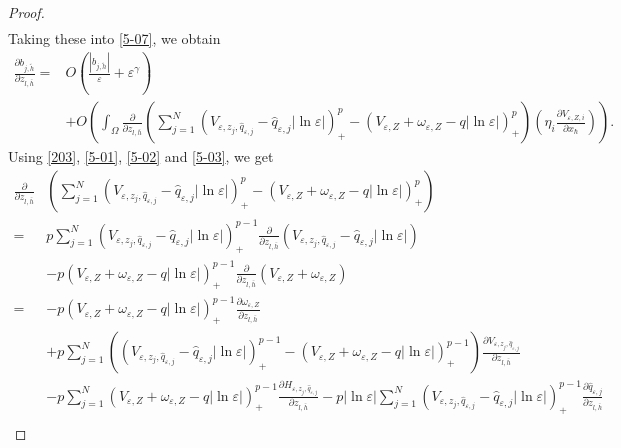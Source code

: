 \documentclass[12pt,reqno]{amsart}
\numberwithin{equation}{section}
\theoremstyle{definition}
\theoremstyle{remark}
\begin{document}
\begin{proof}
\begin{equation*}
\begin{split}
\end{split}
\end{equation*}
Taking these into \eqref{5-07}, we obtain
\begin{equation}\label{5-08}
\begin{split}
 \frac{\partial b_{j,\tilde{h}}}{\partial z_{l,\bar{h}}}=&O\left (\frac{ |b_{j,\tilde{h}}|}{\varepsilon}+\varepsilon^{\gamma}\right )\\
 &+O\left(  \int_\Omega\frac{\partial }{\partial z_{l,\bar{h}}}\left( \sum_{j=1}^N\left (V_{\varepsilon, z_j, \hat{q}_{\varepsilon,j}}-\hat{q}_{\varepsilon,j}|\ln\varepsilon|\right )^{p}_+-\left (V_{\varepsilon,Z}+\omega_{\varepsilon,Z}-q|\ln\varepsilon|\right )^{p}_+\right) \left( \eta_i\frac{\partial V_{\varepsilon, Z,i}}{\partial x_\hbar}\right) \right) .
\end{split}
\end{equation}
Using \eqref{203}, \eqref{5-01}, \eqref{5-02} and \eqref{5-03}, we get
\begin{equation*}\label{5-09}
\begin{split}
\frac{\partial }{\partial z_{l,\bar{h}}}&\left( \sum_{j=1}^N\left (V_{\varepsilon, z_j, \hat{q}_{\varepsilon,j}}-\hat{q}_{\varepsilon,j}|\ln\varepsilon|\right )^{p}_+-\left (V_{\varepsilon,Z}+\omega_{\varepsilon,Z}-q|\ln\varepsilon|\right )^{p}_+\right)\\
=& p\sum_{j=1}^N\left (V_{\varepsilon, z_j, \hat{q}_{\varepsilon,j}}-\hat{q}_{\varepsilon,j}|\ln\varepsilon|\right )^{p-1}_+\frac{\partial }{\partial z_{l,\bar{h}}}\left (V_{\varepsilon, z_j, \hat{q}_{\varepsilon,j}}-\hat{q}_{\varepsilon,j}|\ln\varepsilon|\right )\\
&-p\left (V_{\varepsilon,Z}+\omega_{\varepsilon,Z}-q|\ln\varepsilon|\right )^{p-1}_+\frac{\partial }{\partial z_{l,\bar{h}}}\left(V_{\varepsilon,Z}+\omega_{\varepsilon,Z} \right)  \\
=&-p\left (V_{\varepsilon,Z}+\omega_{\varepsilon,Z}-q|\ln\varepsilon|\right )^{p-1}_+\frac{\partial \omega_{\varepsilon,Z} }{\partial z_{l,\bar{h}}}\\
&+p\sum_{j=1}^N\left( \left (V_{\varepsilon, z_j, \hat{q}_{\varepsilon,j}}-\hat{q}_{\varepsilon,j}|\ln\varepsilon|\right )^{p-1}_+-\left (V_{\varepsilon,Z}+\omega_{\varepsilon,Z}-q|\ln\varepsilon|\right )^{p-1}_+\right)\frac{\partial V_{\varepsilon, z_j, \hat{q}_{\varepsilon,j}}}{\partial z_{l,\bar{h}}} \\
&-p\sum_{j=1}^N\left (V_{\varepsilon,Z}+\omega_{\varepsilon,Z}-q|\ln\varepsilon|\right )^{p-1}_+\frac{\partial H_{\varepsilon, z_j, \hat{q}_{\varepsilon,j}}}{\partial z_{l,\bar{h}}}-p|\ln\varepsilon|\sum_{j=1}^N\left (V_{\varepsilon, z_j, \hat{q}_{\varepsilon,j}}-\hat{q}_{\varepsilon,j}|\ln\varepsilon|\right )^{p-1}_+\frac{\partial \hat{q}_{\varepsilon,j} }{\partial z_{l,\bar{h}}} \\

\end{split}
\end{equation*}
\end{proof}
\end{document}

